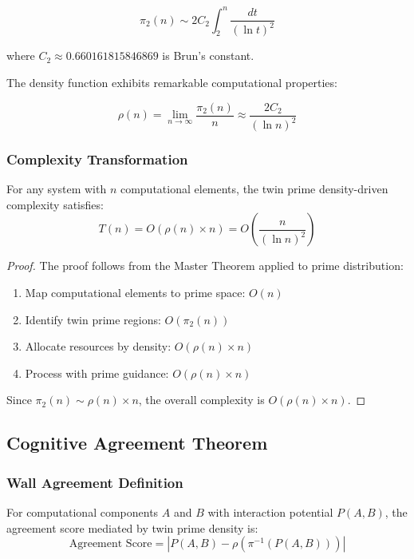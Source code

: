 \documentclass[12pt,a4paper]{article}
\begin{document}
\[
\pi_2(n) \sim 2C_2 \int_2^n \frac{dt}{(\ln t)^2}
\]

where $C_2 \approx 0.660161815846869$ is Brun's constant.

The density function exhibits remarkable computational properties:

\[
\rho(n) = \lim_{n \to \infty} \frac{\pi_2(n)}{n} \approx \frac{2C_2}{(\ln n)^2}
\]

\subsubsection{Complexity Transformation}

\begin{theorem}
For any system with $n$ computational elements, the twin prime density-driven complexity satisfies:
\[
T(n) = O\left(\rho(n) \times n\right) = O\left(\frac{n}{(\ln n)^2}\right)
\]
\end{theorem}

\begin{proof}
The proof follows from the Master Theorem applied to prime distribution:
\begin{enumerate}
    \item Map computational elements to prime space: $O(n)$
    \item Identify twin prime regions: $O(\pi_2(n))$
    \item Allocate resources by density: $O(\rho(n) \times n)$
    \item Process with prime guidance: $O(\rho(n) \times n)$
\end{enumerate}

Since $\pi_2(n) \sim \rho(n) \times n$, the overall complexity is $O(\rho(n) \times n)$.
\end{proof}

\subsection{Cognitive Agreement Theorem}

\subsubsection{Wall Agreement Definition}

\begin{theorem}
For computational components $A$ and $B$ with interaction potential $P(A,B)$, the agreement score mediated by twin prime density is:
\[
\text{Agreement Score} = \left| P(A,B) - \rho\left(\pi^{-1}(P(A,B))\right) \right|
\]
\end{theorem}
\end{document}
